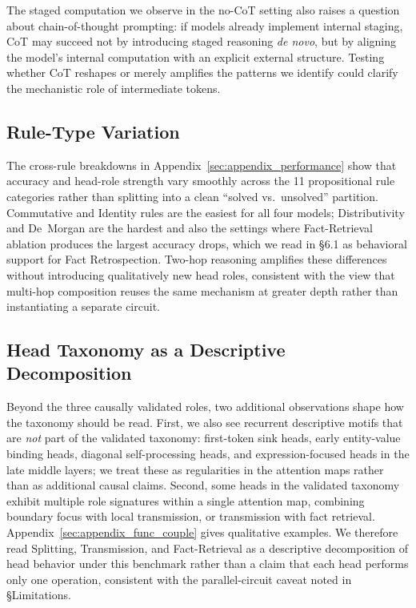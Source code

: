 \documentclass[11pt]{article}
\begin{document}
The staged computation we observe in the no-CoT setting also raises a question about chain-of-thought prompting: if models already implement internal staging, CoT may succeed not by introducing staged reasoning \textit{de novo}, but by aligning the model's internal computation with an explicit external structure. Testing whether CoT reshapes or merely amplifies the patterns we identify could clarify the mechanistic role of intermediate tokens.

\subsection{Rule-Type Variation}
The cross-rule breakdowns in Appendix~\ref{sec:appendix_performance} show that accuracy and head-role strength vary smoothly across the 11 propositional rule categories rather than splitting into a clean ``solved vs.\ unsolved'' partition. Commutative and Identity rules are the easiest for all four models; Distributivity and De~Morgan are the hardest and also the settings where Fact-Retrieval ablation produces the largest accuracy drops, which we read in §6.1 as behavioral support for Fact Retrospection. Two-hop reasoning amplifies these differences without introducing qualitatively new head roles, consistent with the view that multi-hop composition reuses the same mechanism at greater depth rather than instantiating a separate circuit.

\subsection{Head Taxonomy as a Descriptive Decomposition}
Beyond the three causally validated roles, two additional observations shape how the taxonomy should be read. First, we also see recurrent descriptive motifs that are \emph{not} part of the validated taxonomy: first-token sink heads, early entity-value binding heads, diagonal self-processing heads, and expression-focused heads in the late middle layers; we treat these as regularities in the attention maps rather than as additional causal claims. Second, some heads in the validated taxonomy exhibit multiple role signatures within a single attention map, combining boundary focus with local transmission, or transmission with fact retrieval. Appendix~\ref{sec:appendix_func_couple} gives qualitative examples. We therefore read Splitting, Transmission, and Fact-Retrieval as a descriptive decomposition of head behavior under this benchmark rather than a claim that each head performs only one operation, consistent with the parallel-circuit caveat noted in §Limitations.
\end{document}
